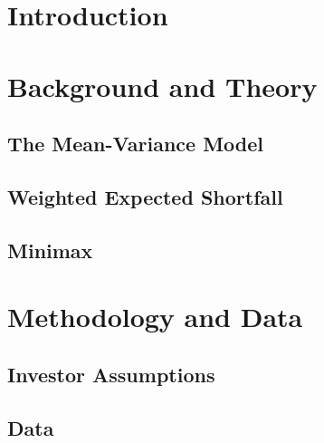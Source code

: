 \documentclass[12pt,a4paper]{article}
\begin{document}


\tableofcontents 

\newpage 



\section{Introduction}
\label{sec:Intro}

\citep{ACERBI20021505}

\section{Background and Theory}
\label{sec:Back}

\subsection{The Mean-Variance Model}
\label{subsec:MVmodel}

\subsection{Weighted Expected Shortfall}
\label{subsec:WES}

\subsection{Minimax}
\label{subsec:Minimax}



\section{Methodology and Data}
\label{sec:Method}

\subsection{Investor Assumptions}
\label{subsec:InvAss}

\subsection{Data}
\label{subsec:Data}
\end{document}
